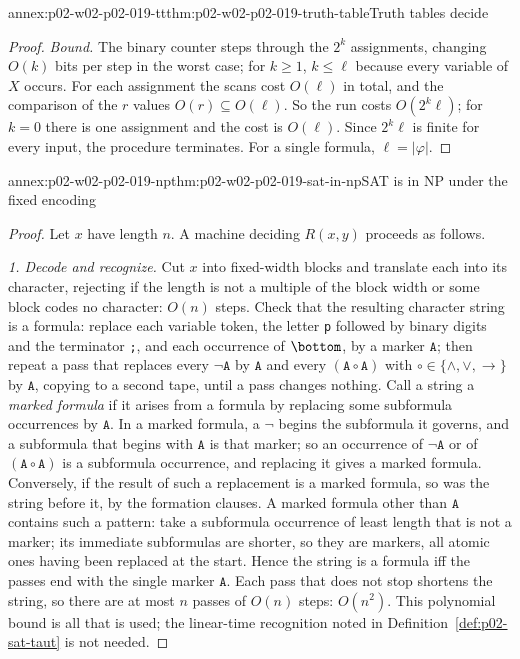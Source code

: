\begin{annexitem}{annex:p02-w02-p02-019-tt}{thm:p02-w02-p02-019-truth-table}{Truth tables decide}
\begin{proof}
\emph{Bound.}  The binary counter steps through the \(2^k\) assignments,
changing \(O(k)\) bits per step in the worst case; for \(k\geq 1\),
\(k\leq\ell\) because every variable of \(X\) occurs.  For each assignment the
scans cost \(O(\ell)\) in total, and the comparison of the \(r\) values
\(O(r)\subseteq O(\ell)\).  So the run costs \(O(2^k\ell)\); for
\(k=0\) there is one assignment and the cost is \(O(\ell)\).  Since
\(2^k\ell\) is finite for every input, the procedure terminates.  For a single
formula, \(\ell=|\varphi|\).
\end{proof}
\end{annexitem}

\begin{annexitem}{annex:p02-w02-p02-019-np}{thm:p02-w02-p02-019-sat-in-np}{SAT is in NP under the fixed encoding}
\begin{proof}
Let \(x\) have length \(n\).  A machine deciding \(R(x,y)\) proceeds as follows.

\emph{1.  Decode and recognize.}  Cut \(x\) into fixed-width blocks and
translate each into its character, rejecting if the length is not a multiple
of the block width or some block codes no character: \(O(n)\) steps.  Check
that the resulting character string is a formula: replace each variable
token, the letter \texttt{p} followed by binary digits and the terminator
\texttt{;}, and each occurrence of \(\bottom\), by a marker \(\mathtt A\); then
repeat a pass that replaces every \(\neg\mathtt A\) by \(\mathtt A\) and
every \((\mathtt A\circ\mathtt A)\) with \(\circ\in\{\land,\lor,\to\}\) by
\(\mathtt A\), copying to a second tape, until a pass changes nothing.  Call
a string a \emph{marked formula} if it arises from a formula by replacing
some subformula occurrences by \(\mathtt A\).  In a marked formula, a
\(\neg\) begins the subformula it governs, and a subformula that begins with
\(\mathtt A\) is that marker; so an occurrence of \(\neg\mathtt A\) or of
\((\mathtt A\circ\mathtt A)\) is a subformula occurrence, and replacing it
gives a marked formula.  Conversely, if the result of such a replacement is a
marked formula, so was the string before it, by the formation clauses.  A
marked formula other than \(\mathtt A\) contains such a pattern: take a
subformula occurrence of least length that is not a marker; its immediate
subformulas are shorter, so they are markers, all atomic ones having been
replaced at the start.  Hence the string
is a formula iff the passes end with the single marker \(\mathtt A\).  Each
pass that does not stop
shortens the string, so there are at most \(n\) passes of \(O(n)\) steps:
\(O(n^2)\).  This polynomial bound is all that is used; the linear-time
recognition noted in Definition~\ref{def:p02-sat-taut} is not needed.


\end{proof}
\end{annexitem}
